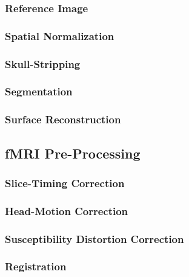 \documentclass[conference]{IEEEtran}
\begin{document}
\subsubsection{Reference Image}

\subsubsection{Spatial Normalization}


\subsubsection{Skull-Stripping}


\subsubsection{Segmentation}


\subsubsection{Surface Reconstruction}


\subsection{fMRI Pre-Processing}
\subsubsection{Slice-Timing Correction}


\subsubsection{Head-Motion Correction}


\subsubsection{Susceptibility Distortion Correction}


\subsubsection{Registration}
\end{document}
